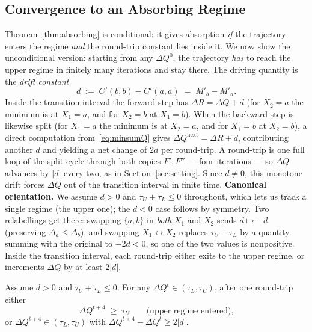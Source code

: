 \subsection{Convergence to an Absorbing Regime}\label{sec:convergence}
Theorem~\ref{thm:absorbing} is conditional: it gives absorption \emph{if} the trajectory enters the regime \emph{and} the round-trip constant lies inside it.  We now show the unconditional version: starting from any $\Delta Q^0$, the trajectory \emph{has} to reach the upper regime in finitely many iterations and stay there.
The driving quantity is the \emph{drift constant}
\[
    d \;:=\; C'(b,b) - C'(a,a) \;=\; M'_b - M'_a.
\]
Inside the transition interval the forward step has $\Delta R = \Delta Q + d$ (for $X_2=a$ the minimum is at $X_1=a$, and for $X_2=b$ at $X_1=b$).  When the backward step is likewise split (for $X_1=a$ the minimum is at $X_2=a$, and for $X_1=b$ at $X_2=b$), a direct computation from~\eqref{eq:minsumQ} gives $\Delta Q^{\text{next}} = \Delta R + d$, contributing another $d$ and yielding a net change of $2d$ per round-trip.  A round-trip is one full loop of the split cycle through both copies $F', F''$ --- four iterations --- so $\Delta Q$ advances by $|d|$ every two, as in Section~\ref{sec:setting}.  Since $d \neq 0$, this monotone drift forces $\Delta Q$ out of the transition interval in finite time.
\textbf{Canonical orientation.}  We assume $d > 0$ and $\tau_U + \tau_L \leq 0$ throughout, which lets us track a single regime (the upper one); the $d < 0$ case follows by symmetry.  Two relabellings get there: swapping $\{a, b\}$ in \emph{both} $X_1$ and $X_2$ sends $d \mapsto -d$ (preserving $\Delta_a \leq \Delta_b$), and swapping $X_1 \leftrightarrow X_2$ replaces $\tau_U + \tau_L$ by a quantity summing with the original to $-2d < 0$, so one of the two values is nonpositive.
Inside the transition interval, each round-trip either exits to the upper regime, or increments $\Delta Q$ by at least $2|d|$.
\begin{lemma}\label{lem:drift}
Assume $d > 0$ and $\tau_U + \tau_L \leq 0$.  For any $\Delta Q^t \in (\tau_L, \tau_U)$, after one round-trip either
\[
    \Delta Q^{t+4} \;\geq\; \tau_U \qquad\text{(upper regime entered),}
\]
or $\Delta Q^{t+4} \in (\tau_L, \tau_U)$ with $\Delta Q^{t+4} - \Delta Q^t \geq 2|d|$.
\end{lemma}
